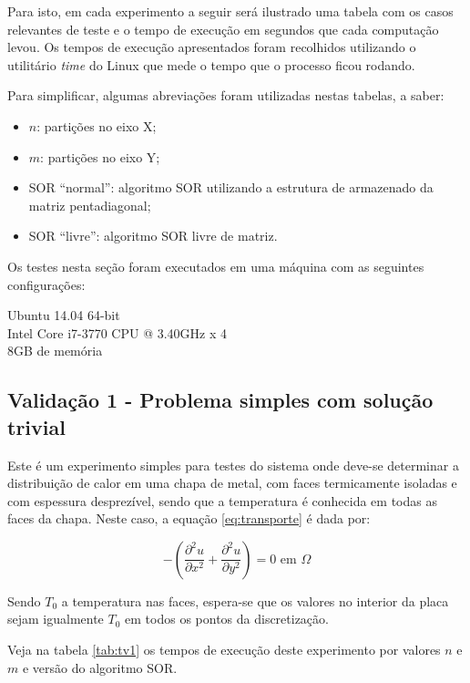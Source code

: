 \documentclass[
	11pt,				%
	oneside,			%
	a4paper,			%
	english,			%
	brazil,				%
	]{article}
\begin{document}
Para isto, em cada experimento a seguir será ilustrado uma
tabela com os casos relevantes de teste e o tempo de
execução em segundos que cada computação levou. Os tempos
de execução apresentados foram recolhidos utilizando o
utilitário \textit{time} do Linux que mede o tempo que o
processo ficou rodando.

Para simplificar, algumas abreviações foram utilizadas nestas
tabelas, a saber:
\begin{itemize}
 \item $n$: partições no eixo X;
 \item $m$: partições no eixo Y;
 \item SOR ``normal'': algoritmo SOR utilizando a estrutura de
 armazenado da matriz pentadiagonal;
 \item SOR ``livre'': algoritmo SOR livre de matriz.
\end{itemize}

Os testes nesta seção foram executados em uma máquina com as seguintes configurações:

Ubuntu 14.04 64-bit \\
\indent Intel Core i7-3770 CPU @ 3.40GHz x 4 \\
\indent 8GB de memória


\subsection{Validação 1 - Problema simples com solução trivial}
Este é um experimento simples para testes do sistema onde
deve-se determinar a distribuição de calor em uma chapa de
metal, com faces termicamente isoladas e com espessura
desprezível, sendo que a temperatura é conhecida em todas
as faces da chapa. Neste caso, a equação \eqref{eq:transporte}
é dada por:

\begin{equation} \label{eq:v1}
- \left(\frac{\partial^2 u}{\partial x^2} + \frac{\partial^2 u}{\partial 
y^2}\right) = 0 \text{ em } \Omega
\end{equation}

Sendo $T_0$ a temperatura nas faces, espera-se que os valores
no interior da placa sejam igualmente $T_0$ em todos os pontos
da discretização.

Veja na tabela \ref{tab:tv1} os tempos de execução deste experimento
por valores $n$ e $m$ e versão do algoritmo SOR.
\end{document}
